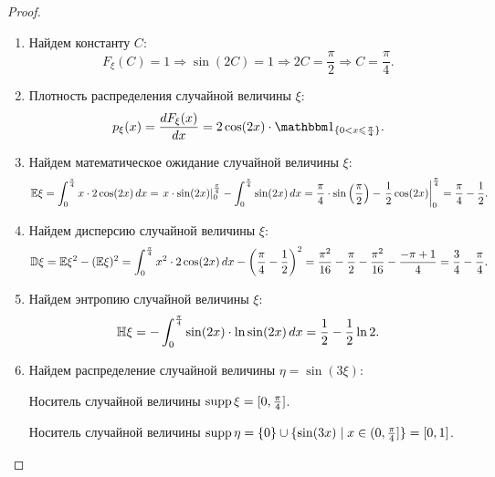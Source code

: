 \begin{proof}
  \begin{enumerate}
    \item Найдем константу $ C $:
          \[
            F_{\xi}(C) = 1 \Rightarrow \sin(2C) = 1 \Rightarrow 2C = \frac{\pi}{2} \Rightarrow C = \frac{\pi}{4}.
          \]

    \item Плотность распределения случайной величины $ \xi $:
          \[
            p_{\xi}(x) = \frac{dF_{\xi}(x)}{dx} = 2 \cos(2x) \cdot \ind{0 < x \leqslant \frac{\pi}{4}}.
          \]

    \item Найдем математическое ожидание случайной величины $ \xi $:
          \[
            \mathbb E\xi = \int_{0}^{\frac{\pi}{4}} x \cdot 2 \cos(2x) \, dx = \left. x \cdot \sin(2x) \right|_{0}^{\frac{\pi}{4}} - \int_{0}^{\frac{\pi}{4}} \sin(2x) \, dx = \frac{\pi}{4} \cdot \sin\left( \frac{\pi}{2} \right) - \left. \frac{1}{2} \cos(2x) \right|_{0}^{\frac{\pi}{4}} = \frac{\pi}{4} - \frac{1}{2}.
          \]

    \item Найдем дисперсию случайной величины $ \xi $:
          \[
            \mathbb D\xi = \mathbb E\xi^{2} - (\mathbb E\xi)^{2} = \int_{0}^{\frac{\pi}{4}} x^{2} \cdot 2 \cos(2x) \, dx - \left( \frac{\pi}{4} - \frac{1}{2} \right)^{2} = \frac{\pi^{2}}{16} - \frac{\pi}{2} - \frac{\pi^2}{16} - \frac{-\pi+1}{4} = \frac{3}{4} - \frac{\pi}{4}.
          \]

    \item Найдем энтропию случайной величины $ \xi $:
          \[
            \mathbb H\xi = - \int_{0}^{\frac{\pi}{4}} \sin(2x) \cdot \ln \sin(2x) \, dx = \frac{1}{2} - \frac{1}{2}\ln 2.
          \]

    \item Найдем распределение случайной величины $ \eta = \sin(3\xi) $:

          Носитель случайной величины $ \operatorname{\mathop{supp}} \xi = [0, \frac{\pi}{4}] $.

          Носитель случайной величины $ \operatorname{\mathop{supp}} \eta = \{0\} \cup \{ \sin(3x) \mid x \in (0, \frac{\pi}{4}] \} = [0, 1]$.


\end{enumerate}
\end{proof}
